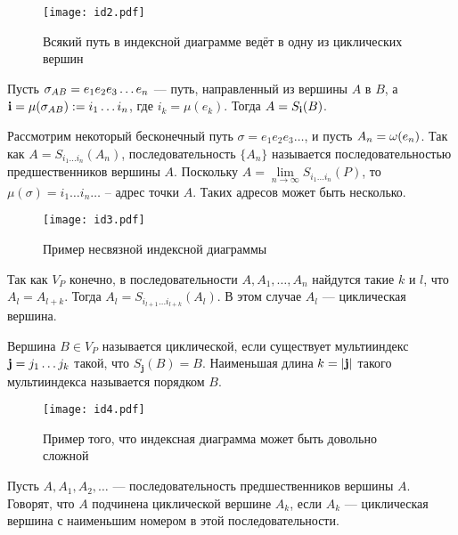 \begin{figure}[H]
    \centering
    \texttt{[image: id2.pdf]}
    \caption{Всякий путь в индексной диаграмме ведёт в одну из циклических вершин}
    \label{img:id2}
\end{figure}

Пусть $\sigma_{AB}=e_1 e_2 e_3 \ldots e_n$ --- путь, направленный из вершины $A$ в $B$, а ${\bf{i}}=\mu(\sigma_{AB}):=i_1\ldots i_n$, где $i_k=\mu(e_k)$. Тогда $A=S_{\bf{i}}(B)$.

Рассмотрим некоторый бесконечный путь $\sigma=e_1 e_2 e_3 \ldots$, и пусть $A_n=\omega(e_n)$. Так как $A=S_{i_1\ldots i_n}(A_n)$, последовательность $\{A_n\}$ называется последовательностью предшественников вершины $A$. Поскольку $A=\lim\limits_{n\to \infty} S_{i_1\ldots i_n}(P)$, то $\mu(\sigma)=i_1\ldots i_n\ldots$ -- адрес точки $A$. Таких адресов может быть несколько.

\begin{figure}[H]
    \centering
    \texttt{[image: id3.pdf]}
\caption{Пример несвязной индексной диаграммы}
\label{img:id3}
\end{figure}

Так как $V_P$ конечно, в последовательности $A, A_1, \ldots, A_n$ найдутся такие $k$ и $l$, что $A_{l}=A_{l+k}$. Тогда $A_{l}=S_{i_{l+1}\ldots i_{l+k}}(A_l)$. В этом случае $A_l$  --- циклическая вершина.

\begin{definition}
Вершина $B\in V_P$ называется циклической, если существует мультииндекс ${\bf{j}}=j_1\ldots j_k$ такой, что $S_{\bm{j}}(B)=B$. Наименьшая длина $k=|{\bf{j}}|$ такого мультииндекса называется порядком $B$.
\end{definition}

\begin{figure}[H]
    \centering
    \texttt{[image: id4.pdf]}
    \caption{Пример того, что индексная диаграмма может быть довольно сложной}
    \label{img:id4}
\end{figure}


\begin{definition}
Пусть $A, A_1, A_2, \ldots$ --- последовательность предшественников вершины $A$. 
Говорят, что $A$ подчинена циклической вершине $A_k$, если $A_k$ --- циклическая вершина с наименьшим номером в этой последовательности.
\end{definition}

